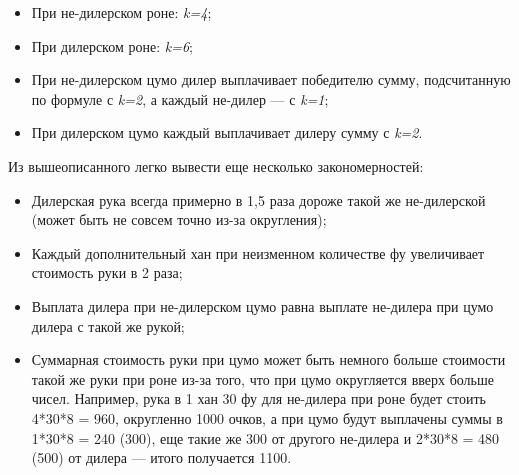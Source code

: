 \begin{itemize}
	\item При не-дилерском роне: \textit{k=4};
	\item При дилерском роне: \textit{k=6};
	\item При не-дилерском цумо дилер выплачивает победителю сумму, подсчитанную по формуле с \textit{k=2}, а каждый не-дилер --- с \textit{k=1};
	\item При дилерском цумо каждый выплачивает дилеру сумму с \textit{k=2}.
\end{itemize}

Из вышеописанного легко вывести еще несколько закономерностей:

\begin{itemize}
	\item Дилерская рука всегда примерно в 1,5 раза дороже такой же не-дилерской (может быть не совсем точно из-за округления);
	\item Каждый дополнительный хан при неизменном количестве фу увеличивает стоимость руки в 2 раза;
	\item Выплата дилера при не-дилерском цумо равна выплате не-дилера при цумо дилера с такой же рукой;
	\item Суммарная стоимость руки при цумо может быть немного больше стоимости такой же руки при роне из-за того, что при цумо округляется вверх больше чисел. Например, рука в 1 хан 30 фу для не-дилера при роне будет стоить 4*30*8 = 960, округленно 1000 очков, а при цумо будут выплачены суммы в 1*30*8 = 240 (300), еще такие же 300 от другого не-дилера и 2*30*8 = 480 (500) от дилера --- итого получается 1100.
\end{itemize}

